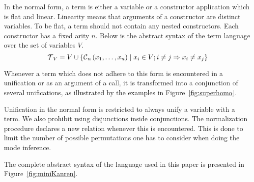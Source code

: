In the normal form, a term is either a variable or a constructor application which is flat and linear.
Linearity means that arguments of a constructor are distinct variables.
To be flat, a term should not contain any nested constructors.
Each constructor has a fixed arity $n$.
Below is the abstract syntax of the term language over the set of variables $V$.
\[  \operatorname{\mathcal{T}}_{V} = V \cup \{\operatorname{\mathcal{C}}_{n}\left( x_1, \ldots, x_{n} \right) \mid x_{i}\in V; i \neq j \Rightarrow x_i \neq x_j\} \]


Whenever a term which does not adhere to this form is encountered in a unification or as an argument of a call, it is transformed into a conjunction of several unifications, as illustrated by the examples in Figure~\ref{fig:superhomo}.

Unification in the normal form is restricted to always unify a variable with a term.
We also prohibit using disjunctions inside conjunctions.
The normalization procedure declares a new relation whenever this is encountered.
This is done to limit the number of possible permutations one has to consider when doing the mode inference.

The complete abstract syntax of the \mk language used in this paper is presented in Figure~\ref{fig:miniKanren}.